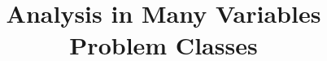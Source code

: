 \documentclass[a4paper, answers]{exam}
\title{Analysis in Many Variables Problem Classes}
\author{}
\begin{document}
    \maketitle
    \begin{questions}
%       
        
    \end{questions}
\end{document}
